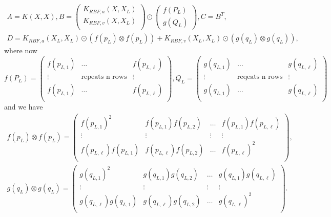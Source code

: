 \documentclass{statsmsc}
\begin{document}
\begin{equation}
\begin{gathered}
A=K(X,X), B=\begin{pmatrix}
    K_{RBF,a}(X, X_L) \\ K_{RBF,v}(X, X_L) \\
\end{pmatrix}\odot \begin{pmatrix}
    f(P_L) \\ g(Q_L)
\end{pmatrix}, C=B^T,\\ D=K_{RBF,a}(X_L, X_L)\odot (f(p_L)\otimes f(p_L)) + K_{RBF,v}(X_L, X_L)\odot (g(q_L)\otimes g(q_L)),
\end{gathered}
\label{equ:ABCDp}
\end{equation}
where now
$$
f(P_L)=\begin{pmatrix}
  f(p_{L,1})  & \dots & f(p_{L,\ell})  \\
  \vdots & \text{repeats n rows} &  \vdots\\
  f(p_{L,1})  & \dots & f(p_{L,\ell})  \\
\end{pmatrix},
Q_L=\begin{pmatrix}
  g(q_{L,1})  & \dots & g(q_{L,\ell})  \\
  \vdots & \text{reqeats n rows} &  \vdots\\
  g(q_{L,1})  & \dots & g(q_{L,\ell})  \\
\end{pmatrix}
$$
and we have 
$$
  \begin{gathered}
f(p_L)\otimes f(p_L)=\begin{pmatrix}
  f(p_{L,1})^2 & f(p_{L,1})f(p_{L,2}) & \dots & f(p_{L,1})f(p_{L,\ell}) \\
  \vdots & \vdots & \vdots & \vdots \\
  f(p_{L,\ell})f(p_{L,1}) & f(p_{L,\ell})f(p_{L,2}) & \dots & f(p_{L,\ell})^2 \\
\end{pmatrix},\\
g(q_L)\otimes g(q_L)=\begin{pmatrix}
  g(q_{L,1})^2 & g(q_{L,1})g(q_{L,2}) & \dots & g(q_{L,1})g(q_{L,\ell}) \\
  \vdots & \vdots & \vdots & \vdots \\
  g(q_{L,\ell})g(q_{L,1}) & g(q_{L,\ell})g(q_{L,2}) & \dots & g(q_{L,\ell})^2 \\
\end{pmatrix}.
  \end{gathered}
$$
\end{document}
